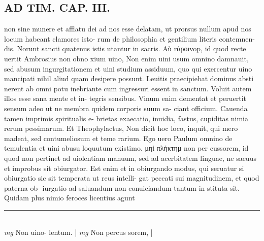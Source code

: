 \documentclass{article}
\begin{document}
\begin{pages}
\section*{AD TIM. CAP. III. }
\marginpar{[ p.127 ]}\pstart non sine munere et afflatu dei ad nos esse delatam, ut prorsus nullum apud nos locum habeant clamores isto- rum de philosophia et gentilium literis contemnen- dis. Norunt sancti quatenus istis utantur in sacris. Aù rάροιvop, id quod recte uertit Ambrosius non obno xium uino, Non enim uini usum omnino damnauit, sed abusum ingurgitationem et uini studium assiduum, quo qui exercentur uino mancipati nihil aliud quam desipere possunt. Leuitis praecipiebat dominus absti nerent ab omni potu inebriante cum ingressuri essent in sanctum. Voluit autem illos esse sana mente et in- tegris sensibus. Vinum enim dementat et peruertit sensum adeo ut ne membra quidem corporis suum sa- ciant officium. Cauenda tamen imprimis spiritualis e- brietas exaecatio, inuidia, fastus, cupiditas nimia rerum pessimarum. Et Theophylactus, Non dicit hoc loco, inquit, qui mero madeat, sed contumeliosum et teme rarium. Ego uero Paulum omnino de temulentia et uini abusu loquutum existimo. μηὶ πλήκτημ non per cussorem, id quod non pertinet ad uiolentiam manuum, sed ad acerbitatem linguae, ne saeuus et improbus sit obiurgator. Est enim et in obiurgando modus, qui seruatur si obiurgatio sic sit temperata ut reus intelli- gat peccati sui magnitudinem, et quod paterna ob- iurgatio ad saluandum non conuiciandum tantum in stituta sit. Quidam plus nimio feroces licentius agunt  \pend
\vspace{0.5cm}\noindent
\vspace{0.2cm}\rule{1cm}{0.2pt}\\ 
\hspace{0.2cm}\textit{mg}
\footnotesize Non uino- lentum. 
\normalsize| 
\hspace{0.2cm}\textit{mg}
\footnotesize Non percus sorem, 
\normalsize| 

\end{pages}
\end{document}
